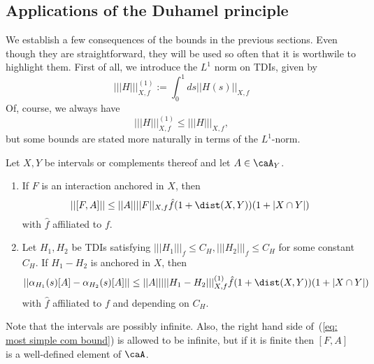 \subsection{Applications of the Duhamel principle}

We establish a few consequences of the bounds in the previous sections. Even though they are straightforward, they will be used so often that it is worthwile to highlight them. First of all, we introduce the $L^1$ norm on TDIs, given by 
$$
||| H |||^{(1)}_{X,f}:= \int_0^1 ds  || H(s) ||_{X,f}
$$
Of, course, we always have 
$$
||| H |||^{(1)}_{X,f}  \leq ||| H |||_{X,f},
$$
but some bounds are stated more naturally in terms of the $L^1$-norm. 
\begin{lemma} \label{lem: evolution by similar tdi}
	Let $X,Y$ be intervals or complements thereof and let $A\in\caA_Y$.
	\begin{enumerate}
		\item If $F$ is an interaction anchored in $X$, then
		\begin{equation}\label{eq: most simple com bound}
			||[F,A]|| \leq  ||A|| ||F||_{X,f} \hat{f}(1+\dist(X,Y)) (1+|X\cap Y|) 
		\end{equation}
		with $\hat{f}$ affiliated to $f$.
		\item
		Let $H_1,H_2$ be TDIs satisfying $|||H_1|||_f \leq C_H, |||H_2|||_f \leq C_H$ for some constant $C_H$. If $H_1-H_2$ is anchored in $X$, then 
		\begin{equation}\label{eq: duhamel practical}
			||\alpha_{H_1}(s)[A]-\alpha_{H_2}(s) [A] || \leq  ||A|| |||H_1-H_2|||^{(1)}_{X,f} \hat{f}(1+\dist(X,Y)) (1+|X\cap Y|)
		\end{equation}
		with $\hat{f}$ affiliated to $f$ and depending on $C_H$. 
	\end{enumerate}
\end{lemma}
\noindent Note that the intervals are possibly infinite. Also, the right hand side of~(\ref{eq: most simple com bound}) is allowed to be infinite, but if it is finite then $[F,A]$ is a well-defined element of $\caA$.
